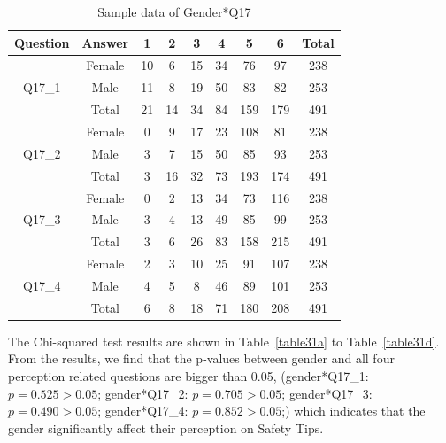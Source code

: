 \begin{table}[h]
  \caption{Sample data of Gender*Q17}
  \label{table30}
  \centering
\begin{tabular}{cc|ccccccc}
\hline
Question & Answer & 1  & 2  & 3  & 4  & 5   & 6   & Total \\
\hline
\multirow{3}{*}{Q17\_1}   & Female & 10 & 6  & 15 & 34 & 76  & 97  & 238                       \\
         & Male   & 11 & 8  & 19 & 50 & 83  & 82  & 253                       \\
         & Total  & 21 & 14 & 34 & 84 & 159 & 179 & 491                       \\
\hline
\multirow{3}{*}{Q17\_2}   & Female & 0  & 9  & 17 & 23 & 108 & 81  & 238                       \\
         & Male   & 3  & 7  & 15 & 50 & 85  & 93  & 253                       \\
         & Total  & 3  & 16 & 32 & 73 & 193 & 174 & 491                       \\
\hline
\multirow{3}{*}{Q17\_3}   & Female & 0  & 2  & 13 & 34 & 73  & 116 & 238                       \\
         & Male   & 3  & 4  & 13 & 49 & 85  & 99  & 253                       \\
         & Total  & 3  & 6  & 26 & 83 & 158 & 215 & 491                       \\
\hline
\multirow{3}{*}{Q17\_4}   & Female & 2  & 3  & 10 & 25 & 91  & 107 & 238                       \\
         & Male   & 4  & 5  & 8  & 46 & 89  & 101 & 253                       \\
         & Total  & 6  & 8  & 18 & 71 & 180 & 208 & 491                     \\
\hline         
\end{tabular}
\end{table}


The Chi-squared test results are shown in Table~\ref{table31a} to Table~\ref{table31d}. From the results, we find that the p-values between gender and all four perception related questions are bigger than 0.05, (gender*Q17\_1: $p=0.525>0.05$; gender*Q17\_2: $p=0.705>0.05$; gender*Q17\_3: $p=0.490>0.05$; gender*Q17\_4: $p=0.852>0.05$;) which indicates that  the gender significantly affect their perception on Safety Tips. 


